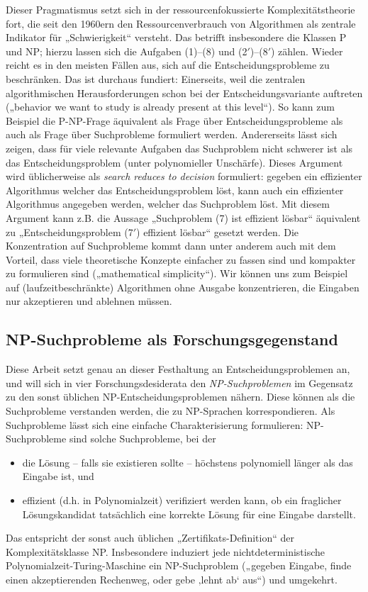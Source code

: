 Dieser Pragmatismus setzt sich in der ressourcenfokussierte Komplexitätstheorie fort, die seit den 1960ern den Ressourcenverbrauch von Algorithmen als zentrale Indikator für „Schwierigkeit“ versteht. Das betrifft insbesondere die Klassen P und NP; hierzu lassen sich die Aufgaben (1)--(8) und (2$'$)--(8$'$) zählen.
Wieder reicht es in den meisten Fällen aus, sich auf die Entscheidungsprobleme zu beschränken.
Das ist durchaus fundiert:
Einerseits, weil die zentralen algorithmischen Herausforderungen schon bei der Entscheidungsvariante auftreten („behavior we want to study is already present at this level“). So kann zum Beispiel die P-NP-Frage äquivalent als Frage über Entscheidungsprobleme als auch als Frage über Suchprobleme formuliert werden. Andererseits lässt sich zeigen, dass für viele relevante Aufgaben das Suchproblem nicht schwerer ist als das Entscheidungsproblem (unter polynomieller Unschärfe). Dieses Argument wird üblicherweise als \emph{search reduces to decision} formuliert: gegeben ein effizienter Algorithmus welcher das Entscheidungsproblem löst, kann auch ein effizienter Algorithmus angegeben werden, welcher das Suchproblem löst. Mit diesem Argument kann z.B. die Aussage „Suchproblem (7) ist effizient lösbar“ äquivalent zu „Entscheidungsproblem (7$'$) effizient lösbar“ gesetzt werden. Die Konzentration auf Suchprobleme kommt dann unter anderem auch mit dem Vorteil, dass viele theoretische Konzepte einfacher zu fassen sind und kompakter zu formulieren sind („mathematical simplicity“). Wir können uns zum Beispiel auf (laufzeitbeschränkte) Algorithmen ohne Ausgabe konzentrieren, die Eingaben nur akzeptieren und ablehnen müssen. 

\subsection*{NP-Suchprobleme als Forschungsgegenstand}

Diese Arbeit setzt genau an dieser Festhaltung an Entscheidungsproblemen an, und will sich in vier Forschungsdesiderata den \emph{NP-Suchproblemen} im Gegensatz zu den sonst üblichen NP-Entscheidungsproblemen nähern.
Diese können als die Suchprobleme verstanden werden, die zu NP-Sprachen korrespondieren. Als Suchprobleme lässt sich eine einfache Charakterisierung formulieren: NP-Suchprobleme sind solche Suchprobleme, bei der 
\begin{itemize}
    \item die Lösung -- falls sie existieren sollte -- höchstens polynomiell länger als das Eingabe ist, und 
    \item effizient (d.h. in Polynomialzeit) verifiziert werden kann, ob ein fraglicher Lösungskandidat tatsächlich eine korrekte Lösung für eine Eingabe darstellt.
\end{itemize}
Das entspricht der sonst auch üblichen „Zertifikats-Definition“ der Komplexitätsklasse NP. Insbesondere induziert jede nichtdeterministische Polynomialzeit-Turing-Maschine ein NP-Suchproblem („gegeben Eingabe, finde einen akzeptierenden Rechenweg, oder gebe ‚lehnt ab‘ aus“) und umgekehrt.

